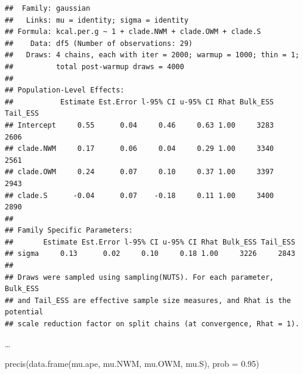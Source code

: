 \documentclass[
  a4paper,11pt,twoside,onecolumn,openright,final,oldfontcommands]{memoir}
\newenvironment{Shaded}{\begin{snugshade}}{\end{snugshade}}
\newcommand{\AttributeTok}[1]{\textcolor[rgb]{0.77,0.63,0.00}{#1}}
\newcommand{\CommentTok}[1]{\textcolor[rgb]{0.56,0.35,0.01}{\textit{#1}}}
\newcommand{\FloatTok}[1]{\textcolor[rgb]{0.00,0.00,0.81}{#1}}
\newcommand{\FunctionTok}[1]{\textcolor[rgb]{0.00,0.00,0.00}{#1}}
\newcommand{\NormalTok}[1]{#1}
\newcommand{\OtherTok}[1]{\textcolor[rgb]{0.56,0.35,0.01}{#1}}
\newcommand{\SpecialCharTok}[1]{\textcolor[rgb]{0.00,0.00,0.00}{#1}}
\theoremstyle{definition}
\theoremstyle{definition}
\theoremstyle{definition}
\theoremstyle{definition}
\theoremstyle{remark}
\begin{document}
\begin{verbatim}
##  Family: gaussian 
##   Links: mu = identity; sigma = identity 
## Formula: kcal.per.g ~ 1 + clade.NWM + clade.OWM + clade.S 
##    Data: df5 (Number of observations: 29) 
##   Draws: 4 chains, each with iter = 2000; warmup = 1000; thin = 1;
##          total post-warmup draws = 4000
## 
## Population-Level Effects: 
##           Estimate Est.Error l-95% CI u-95% CI Rhat Bulk_ESS Tail_ESS
## Intercept     0.55      0.04     0.46     0.63 1.00     3283     2606
## clade.NWM     0.17      0.06     0.04     0.29 1.00     3340     2561
## clade.OWM     0.24      0.07     0.10     0.37 1.00     3397     2943
## clade.S      -0.04      0.07    -0.18     0.11 1.00     3400     2890
## 
## Family Specific Parameters: 
##       Estimate Est.Error l-95% CI u-95% CI Rhat Bulk_ESS Tail_ESS
## sigma     0.13      0.02     0.10     0.18 1.00     3226     2843
## 
## Draws were sampled using sampling(NUTS). For each parameter, Bulk_ESS
## and Tail_ESS are effective sample size measures, and Rhat is the potential
## scale reduction factor on split chains (at convergence, Rhat = 1).
\end{verbatim}

\ldots{}

\begin{Shaded}
\end{Shaded}

\begin{Shaded}
\begin{Highlighting}[]
\FunctionTok{precis}\NormalTok{(}\FunctionTok{data.frame}\NormalTok{(mu.ape, mu.NWM, mu.OWM, mu.S), }\AttributeTok{prob =} \FloatTok{0.95}\NormalTok{)}
\end{Highlighting}
\end{Shaded}
\end{document}
